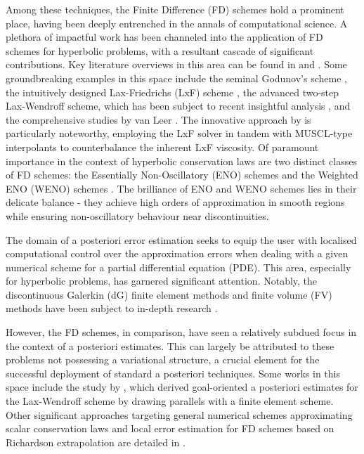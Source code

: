 \documentclass[final]{amsart}
\numberwithin{equation}{section}
\begin{document}
Among these techniques, the Finite Difference (FD) schemes hold a
prominent place, having been deeply entrenched in the annals of
computational science. A plethora of impactful work has been channeled
into the application of FD schemes for hyperbolic problems, with a
resultant cascade of significant contributions. Key literature
overviews in this area can be found in \cite{leveque1992numerical} and
\cite{johnson1997advanced}. Some groundbreaking examples in this space
include the seminal Godunov's scheme \cite{godunov1959difference}, the
intuitively designed Lax-Friedrichs (LxF) scheme \cite{lax1954weak},
the advanced two-step Lax-Wendroff scheme, which has been subject to
recent insightful analysis \cite{liska2021lax}, and the comprehensive
studies by van Leer \cite{van1973towards, van1974towards,
  van1977towards, van1977towardsIV, van1979towards}. The innovative
approach by \cite{nessyahu1990non} is particularly noteworthy,
employing the LxF solver in tandem with MUSCL-type interpolants to
counterbalance the inherent LxF viscosity. Of paramount importance in
the context of hyperbolic conservation laws are two distinct classes
of FD schemes: the Essentially Non-Oscillatory (ENO) schemes
\cite{harten1987uniformly, shu1988efficient, shu1989efficient} and the
Weighted ENO (WENO) schemes \cite{liu1994weighted, jiang1996efficient,
  jiang1998nonoscillatory}. The brilliance of ENO and WENO schemes
lies in their delicate balance - they achieve high orders of
approximation in smooth regions while ensuring non-oscillatory
behaviour near discontinuities.

The domain of a posteriori error estimation seeks to equip the user
with localised computational control over the approximation errors
when dealing with a given numerical scheme for a partial differential
equation (PDE). This area, especially for hyperbolic problems, has
garnered significant attention. Notably, the discontinuous Galerkin
(dG) finite element methods and finite volume (FV) methods have been
subject to in-depth research
\cite{johnson1990adaptive,johnson1995adaptive,dedner2007error,giesselmann2015posteriori,giesselmann2017posteriori,dedner2019residual,ainsworth2011posteriori,verfurth2013posteriori,cockburn1994error,chen2014goal,barth2018finite,semplice2016adaptive,semplice2018adaptive}.

However, the FD schemes, in comparison, have seen a relatively subdued
focus in the context of a posteriori estimates. This can largely be
attributed to these problems not possessing a variational structure, a
crucial element for the successful deployment of standard a posteriori
techniques. Some works in this space include the study by
\cite{collins2014posteriori}, which derived goal-oriented a posteriori
estimates for the Lax-Wendroff scheme by drawing parallels with a
finite element scheme. Other significant approaches targeting general
numerical schemes approximating scalar conservation laws and local
error estimation for FD schemes based on Richardson extrapolation are
detailed in \cite{cockburn1995posteriori, berger1984adaptive,
  arney1988posteriori}.
\end{document}
